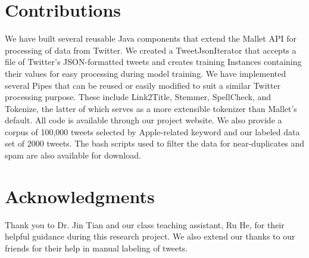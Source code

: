 \documentclass[letterpaper]{article}
\begin{document}
\section{Contributions}
We have built several reusable Java components that extend the Mallet API for processing of data from Twitter. We created a TweetJsonIterator that accepts a file of Twitter's JSON-formatted tweets and creates training Instances containing their values for easy processing during model training. We have implemented several Pipes that can be reused or easily modified to suit a similar Twitter processing purpose. These include Link2Title, Stemmer, SpellCheck, and Tokenize, the latter of which serves as a more extensible tokenizer than Mallet's default. All code is available through our project website. We also provide a corpus of 100,000 tweets selected by Apple-related keyword and our labeled data set of 2000 tweets. The bash scripts used to filter the data for near-duplicates and spam are also available for download.\\

\section{ Acknowledgments}
Thank you to Dr. Jin Tian and our class teaching assistant, Ru He, for their helpful guidance during this research project. We also extend our thanks to our friends for their help in manual labeling of tweets.





\end{document}
